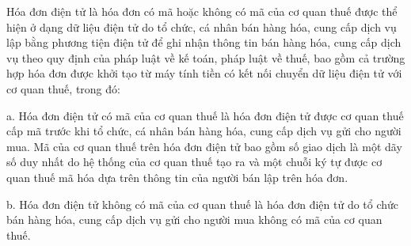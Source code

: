 
Hóa đơn điện tử là hóa đơn có mã hoặc không có mã của cơ quan thuế được thể hiện ở dạng dữ liệu điện tử do tổ chức, cá nhân bán hàng hóa, cung cấp dịch vụ lập bằng phương tiện điện tử để ghi nhận thông tin bán hàng hóa, cung cấp dịch vụ theo quy định của pháp luật về kế toán, pháp luật về thuế, bao gồm cả trường hợp hóa đơn được khởi tạo từ máy tính tiền có kết nối chuyển dữ liệu điện tử với cơ quan thuế, trong đó:

a. Hóa đơn điện tử có mã của cơ quan thuế là hóa đơn điện tử được cơ quan thuế cấp mã trước khi tổ chức, cá nhân bán hàng hóa, cung cấp dịch vụ gửi cho người mua. Mã của cơ quan thuế trên hóa đơn điện tử bao gồm số giao dịch là một dãy số duy nhất do hệ thống của cơ quan thuế tạo ra và một chuỗi ký tự được cơ quan thuế mã hóa dựa trên thông tin của người bán lập trên hóa đơn.

b. Hóa đơn điện tử không có mã của cơ quan thuế là hóa đơn điện tử do tổ chức bán hàng hóa, cung cấp dịch vụ gửi cho người mua không có mã của cơ quan thuế.


